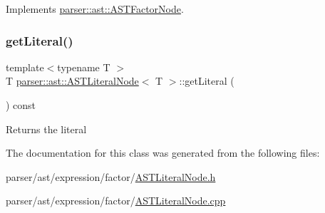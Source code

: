 Implements \hyperlink{classparser_1_1ast_1_1ASTFactorNode_a13eea7f949c0055dea0a9d7b715f16a8}{parser\+::ast\+::\+A\+S\+T\+Factor\+Node}.

\mbox{\label{classparser_1_1ast_1_1ASTLiteralNode_a43466bd413257d43650659383351e612}} 
\subsubsection{\texorpdfstring{get\+Literal()}{getLiteral()}}
{\footnotesize\ttfamily template$<$typename T $>$ \\
T \hyperlink{classparser_1_1ast_1_1ASTLiteralNode}{parser\+::ast\+::\+A\+S\+T\+Literal\+Node}$<$ T $>$\+::get\+Literal (\begin{DoxyParamCaption}{ }\end{DoxyParamCaption}) const}

\begin{DoxyReturn}{Returns}
the literal 
\end{DoxyReturn}


The documentation for this class was generated from the following files\+:\begin{DoxyCompactItemize}
\item 
parser/ast/expression/factor/\hyperlink{ASTLiteralNode_8h}{A\+S\+T\+Literal\+Node.\+h}\item 
parser/ast/expression/factor/\hyperlink{ASTLiteralNode_8cpp}{A\+S\+T\+Literal\+Node.\+cpp}\end{DoxyCompactItemize}
